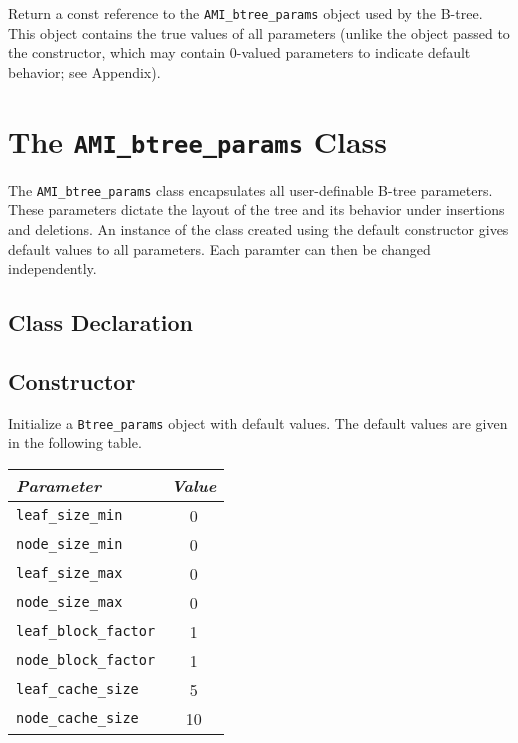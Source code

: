     {Return a const
   reference to the {\tt AMI\_btree\_params} object used by the B-tree. This
   object contains the true values of all parameters (unlike the object
   passed to the constructor, which may contain $0$-valued parameters to
   indicate default behavior; see Appendix).}
\etabb

\section{The {\tt AMI\_btree\_params} Class}
The {\tt AMI\_btree\_params} class encapsulates all user-definable B-tree
parameters. These parameters dictate the layout of the tree and its
behavior under insertions and deletions. An instance of the class created
using the default constructor gives default values to all parameters. Each
paramter can then be changed independently.

\subsection{Class Declaration}

\btabb

   {}

\etabb

\subsection{Constructor}

\btabb

   {Initialize a {\tt Btree\_params} object with
  default values. The default values are given in the following table.\\[1mm]
  \begin{tabular}{|l|c|}
    \hline
    {\em Parameter} & {\em Value} \\ \hline
    {\tt leaf\_size\_min} & 0 \\ \hline
    {\tt node\_size\_min} & 0 \\ \hline
    {\tt leaf\_size\_max} & 0 \\ \hline
    {\tt node\_size\_max} & 0 \\ \hline
    {\tt leaf\_block\_factor} & 1 \\ \hline
    {\tt node\_block\_factor} & 1 \\ \hline
    {\tt leaf\_cache\_size} & 5 \\ \hline
    {\tt node\_cache\_size} & 10 \\ \hline
  \end{tabular}
  }

